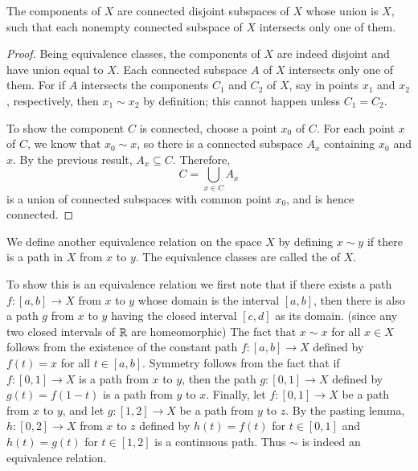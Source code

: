 \documentclass[12pt, a4paper, oneside, openright, titlepage]{book}
\begin{document}
\begin{thm}
    The components of $X$ are connected disjoint subspaces of $X$ whose union is $X$, such that each nonempty connected subspace of $X$ intersects only one of them.
\end{thm}
\begin{proof}
    Being equivalence classes, the components of $X$ are indeed disjoint and have union equal to $X$. Each connected subspace $A$ of $X$ intersects only one of them. For if $A$ intersects the components $C_1$ and $C_2$ of $X$, say in points $x_1$ and $x_2$, respectively, then $x_1 \sim x_2$ by definition; this cannot happen unless $C_1 = C_2$.

    To show the component $C$ is connected, choose a point $x_0$ of $C$. For each point $x$ of $C$, we know that $x_0 \sim x$, so there is a connected subspace $A_x$ containing $x_0$ and $x$. By the previous result, $A_x \subseteq C$. Therefore, \begin{equation*}
        C = \bigcup\limits_{x\in C} A_x
    \end{equation*}
    is a union of connected subspaces with common point $x_0$, and is hence connected.
\end{proof}

\begin{defn}
    We define another equivalence relation on the space $X$ by defining $x \sim y$ if there is a path in $X$ from $x$ to $y$. The equivalence classes are called the  of $X$.
\end{defn}

To show this is an equivalence relation we first note that if there exists a path $f:[a,b]\rightarrow X$ from $x$ to $y$ whose domain is the interval $[a,b]$, then there is also a path $g$ from $x$ to $y$ having the closed interval $[c,d]$ as its domain. (since any two closed intervals of $\mathbb R$ are homeomorphic) The fact that $x \sim x$ for all $x \in X$ follows from the existence of the constant path $f:[a,b]\rightarrow X$ defined by $f(t) = x$ for all $t \in [a,b]$. Symmetry follows from the fact that if $f:[0,1]\rightarrow X$ is a path from $x$ to $y$, then the path $g:[0,1]\rightarrow X$ defined by $g(t) = f(1-t)$ is a path from $y$ to $x$. Finally, let $f:[0,1]\rightarrow X$ be a path from $x$ to $y$, and let $g:[1,2]\rightarrow X$ be a path from $y$ to $z$. By the pasting lemma, $h:[0,2]\rightarrow X$ from $x$ to $z$ defined by $h(t) = f(t)$ for $t \in [0,1]$ and $h(t) = g(t)$ for $t \in [1,2]$ is a continuous path. Thus $\sim$ is indeed an equivalence relation.
\end{document}
